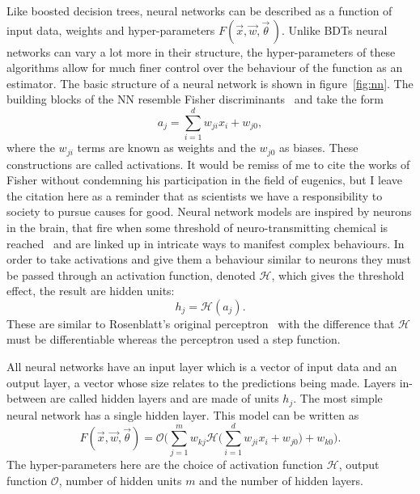 Like boosted decision trees, neural networks can be described as a function of
input data, weights and hyper-parameters $F(\vec{x}, \vec{w}, \vec{\theta} \,)$.
Unlike BDTs neural networks can vary a lot more in their structure, the
hyper-parameters of these algorithms allow for much finer control over the
behaviour of the function as an estimator. The basic structure of a neural
network is shown in figure~\ref{fig:nn}.  The building blocks of the NN resemble
Fisher discriminants~\cite{Fisher} and take the form
\begin{equation}
a_j = \sum_{i=1}^{d} w_{ji}x_{i} + w_{j0},
\label{eq:fisher}
\end{equation}
where the $w_{ji}$ terms are known as weights and the $w_{j0}$ as biases. These
constructions are called activations. It would be remiss of me to cite the works
of Fisher without condemning his participation in the field of eugenics, but I
leave the citation here as a reminder that as scientists we have a
responsibility to society to pursue causes for good. Neural network models are
inspired by neurons in the brain, that fire when some threshold of
neuro-transmitting chemical is reached~\cite{neuron} and are linked up in
intricate ways to manifest complex behaviours. In order to take activations and
give them a behaviour similar to neurons they must be passed through an
activation function, denoted $\mathcal{H}$, which gives the threshold effect,
the result are hidden units:
\begin{equation}
h_j = \mathcal{H}(a_j).
\label{eq:hiddenunit}
\end{equation}
These are similar to Rosenblatt's original perceptron~\cite{Rosenblatt} with the
difference that $\mathcal{H}$ must be differentiable whereas the perceptron used
a step function.

All neural networks  have an input layer which is a vector of input data and an
output layer, a vector whose size relates to the predictions being made. Layers
in-between are called hidden layers and are made of units $h_j$. The most simple
neural network has a single hidden layer. This model can be written as
\begin{equation}
F(\vec{x},\vec{w}, \vec{\theta}) = \mathcal{O} \Bigg( \sum_{j=1}^{m} w_{kj}
\mathcal{H} \Bigg( \sum_{i=1}^{d} w_{ji} x_{i} + w_{j0} \Bigg) + w_{k0} \Bigg).
\label{eq:basicnn}
\end{equation}
 The hyper-parameters here are the choice of activation function $\mathcal{H}$,
 output function $\mathcal{O}$, number of hidden units $m$ and the number of
 hidden layers.
 

